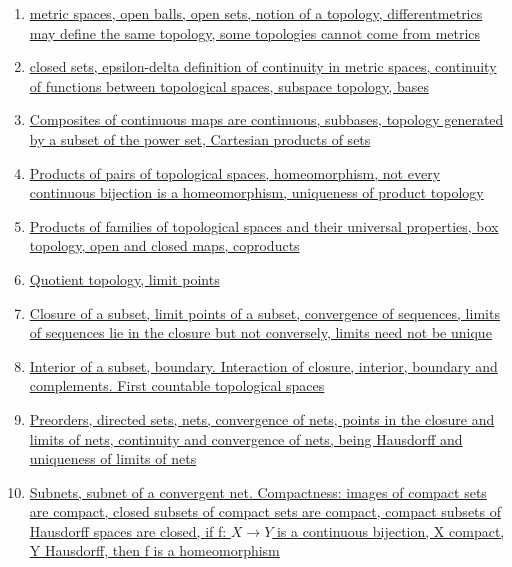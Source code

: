 \documentclass[11pt]{article}
\begin{document}
\begin{enumerate}
	\item \href{https://mp.weixin.qq.com/s/e_pmSIvauYPGcgV2_EvVFw}{metric spaces, open balls, open sets, notion of a topology, differentmetrics may define the same topology, some topologies cannot come from metrics}	%
	\item \href{https://mp.weixin.qq.com/s/L6OgzKDD_blNz5FwskpOvw}{closed sets, epsilon-delta definition of continuity in metric spaces, continuity of functions between topological spaces, subspace topology, bases}	%
	\item \href{https://mp.weixin.qq.com/s/bWjzi_gcGr7sYpb-YIa-eg}{ Composites of continuous maps are continuous, subbases, topology generated by a subset of the power set, Cartesian products of sets}	%
	\item \href{https://mp.weixin.qq.com/s/sFO53AyDxIvYCVLAtoezfA}{ Products of pairs of topological spaces, homeomorphism, not every continuous bijection is a homeomorphism, uniqueness of product topology}	%
	\item \href{https://mp.weixin.qq.com/s/_GPtW3xIJm5IUk94xCa5lA}{Products of families of topological spaces and their universal properties, box topology, open and closed maps, coproducts}	%
	\item \href{https://mp.weixin.qq.com/s/dYNtDxUOyhse8sCc0tMY3A}{Quotient topology, limit points}	%
	\item \href{https://mp.weixin.qq.com/s/Hcqz3hAf9aO-sx9uNLdqtg}{Closure of a subset, limit points of a subset, convergence of sequences, limits of sequences lie in the closure but not conversely, limits need not be unique}	%
	\item \href{https://mp.weixin.qq.com/s/T2M8zFK7ikwLGcVZei2Z3g}{ Interior of a subset, boundary. Interaction of closure, interior, boundary and complements. First countable topological spaces}	%
	\item \href{https://mp.weixin.qq.com/s/uB-yj-nlkjzX0mryoMOgSQ}{Preorders, directed sets, nets, convergence of nets, points in the closure and limits of nets, continuity and convergence of nets, being Hausdorff and uniqueness of limits of nets}	%
	\item \href{https://mp.weixin.qq.com/s/XJ5Y2ZRm8zaOx-Q5wIq98A}{ Subnets, subnet of a convergent net. Compactness: images of compact sets are compact, closed subsets of compact sets are compact, compact subsets of Hausdorff spaces are closed, if f: $X \rightarrow Y$ is a continuous bijection, X compact, Y Hausdorff, then f is a homeomorphism}	%

\end{enumerate}
\end{document}
